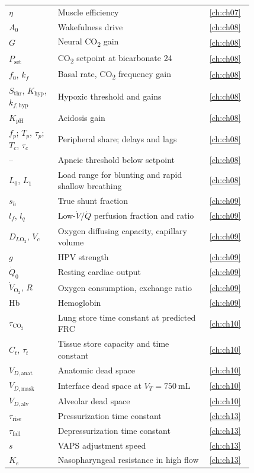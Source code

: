 {\begin{longtable}{@{}p{0.2\linewidth} p{0.62\linewidth} l@{}}
$\eta$ & Muscle efficiency & \cref{ch:ch07} \\
$A_0$ & Wakefulness drive & \cref{ch:ch08} \\
$G$ & Neural CO\textsubscript{2} gain & \cref{ch:ch08} \\
$P_{\mathrm{set}}$ & CO\textsubscript{2} setpoint at bicarbonate 24 & \cref{ch:ch08} \\
$f_0$, $k_f$ & Basal rate, CO\textsubscript{2} frequency gain & \cref{ch:ch08} \\
$S_{\mathrm{thr}}$, $K_{\mathrm{hyp}}$, $k_{f,\mathrm{hyp}}$ & Hypoxic threshold and gains & \cref{ch:ch08} \\
$K_{\mathrm{pH}}$ & Acidosis gain & \cref{ch:ch08} \\
$f_p$; $T_p$, $\tau_p$; $T_c$, $\tau_c$ & Peripheral share; delays and lags & \cref{ch:ch08} \\
-- & Apneic threshold below setpoint & \cref{ch:ch08} \\
$L_0$, $L_1$ & Load range for blunting and rapid shallow breathing & \cref{ch:ch08} \\
$s_h$ & True shunt fraction & \cref{ch:ch09} \\
$l_f$, $l_q$ & Low-$\dot V/\dot Q$ perfusion fraction and ratio & \cref{ch:ch09} \\
$D_{L\mathrm{O_2}}$, $V_c$ & Oxygen diffusing capacity, capillary volume & \cref{ch:ch09} \\
$g$ & HPV strength & \cref{ch:ch09} \\
$\dot Q_0$ & Resting cardiac output & \cref{ch:ch09} \\
$\dot V_{\mathrm{O_2}}$, $R$ & Oxygen consumption, exchange ratio & \cref{ch:ch09} \\
Hb & Hemoglobin & \cref{ch:ch09} \\
$\tau_{\mathrm{CO_2}}$ & Lung store time constant at predicted FRC & \cref{ch:ch10} \\
$C_t$, $\tau_t$ & Tissue store capacity and time constant & \cref{ch:ch10} \\
$V_{D,\mathrm{anat}}$ & Anatomic dead space & \cref{ch:ch10} \\
$V_{D,\mathrm{mask}}$ & Interface dead space at $V_T = \SI{750}{\milli\liter}$ & \cref{ch:ch10} \\
$V_{D,\mathrm{alv}}$ & Alveolar dead space & \cref{ch:ch10} \\
$\tau_{\mathrm{rise}}$ & Pressurization time constant & \cref{ch:ch13} \\
$\tau_{\mathrm{fall}}$ & Depressurization time constant & \cref{ch:ch13} \\
$s$ & VAPS adjustment speed & \cref{ch:ch13} \\
$K_e$ & Nasopharyngeal resistance in high flow & \cref{ch:ch13} \\
\end{longtable}}

